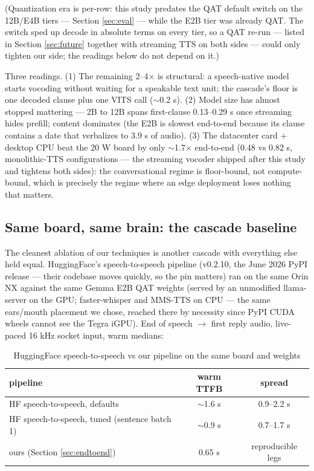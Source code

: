\documentclass{article}
\begin{document}
(Quantization era is per-row: this study predates the QAT default switch on
the 12B/E4B tiers --- Section \ref{sec:eval} --- while the E2B tier was already
QAT. The switch sped up decode in absolute terms on every tier, so a QAT
re-run --- listed in Section \ref{sec:future} together with streaming TTS on
both sides --- could only tighten our side; the readings below do not depend
on it.)

Three readings. (1) The remaining 2--4× is structural: a speech-native model starts vocoding without waiting for a speakable text unit; the cascade's floor is one decoded clause plus one VITS call ($\sim$0.2 s). (2) Model size has almost stopped mattering --- 2B to 12B spans first-clause 0.13--0.29 s once streaming hides prefill; content dominates (the E2B is slowest end-to-end because its clause contains a date that verbalizes to 3.9 s of audio). (3) The datacenter card + desktop CPU beat the 20 W board by only $\sim$1.7× end-to-end (0.48 vs 0.82 s, monolithic-TTS configurations --- the streaming vocoder shipped after this study and tightens both sides): the conversational regime is floor-bound, not compute-bound, which is precisely the regime where an edge deployment loses nothing that matters.

\subsection{Same board, same brain: the cascade baseline}
\label{sec:hfcompare}

The cleanest ablation of our techniques is another cascade with everything else held equal. HuggingFace's speech-to-speech pipeline (v0.2.10, the June 2026 PyPI release --- their codebase moves quickly, so the pin matters) ran on the same Orin NX against the same Gemma E2B QAT weights (served by an unmodified llama-server on the GPU; faster-whisper and MMS-TTS on CPU --- the same ears/mouth placement we chose, reached there by necessity since PyPI CUDA wheels cannot see the Tegra iGPU). End of speech $\rightarrow$ first reply audio, live-paced 16 kHz socket input, warm medians:

\begin{table}[H]
	\centering
	\begin{tabular}{>{\raggedright\arraybackslash}p{4cm}cc}
		\toprule
		pipeline & warm TTFB & spread \\
		\midrule
		HF speech-to-speech, defaults & $\sim$1.6 s & 0.9--2.2 s \\
		HF speech-to-speech, tuned (sentence batch 1) & $\sim$0.9 s & 0.7--1.7 s \\
		ours (Section \ref{sec:endtoend}) & 0.65 s & reproducible legs \\
		\bottomrule
	\end{tabular}
	\caption{HuggingFace speech-to-speech vs our pipeline on the same board and weights}
	\label{tab:hf-comparison}
\end{table}
\end{document}
